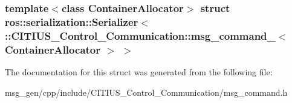 \subsubsection*{template$<$class Container\-Allocator$>$ struct ros\-::serialization\-::\-Serializer$<$ \-::\-C\-I\-T\-I\-U\-S\-\_\-\-Control\-\_\-\-Communication\-::msg\-\_\-command\-\_\-$<$ Container\-Allocator $>$ $>$}



\-The documentation for this struct was generated from the following file\-:\begin{DoxyCompactItemize}
\item 
msg\-\_\-gen/cpp/include/\-C\-I\-T\-I\-U\-S\-\_\-\-Control\-\_\-\-Communication/msg\-\_\-command.\-h\end{DoxyCompactItemize}
